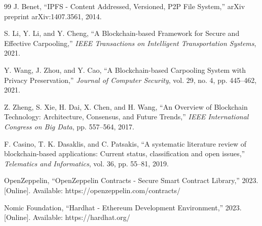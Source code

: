 \documentclass[12pt]{report}
\theoremstyle{plain}
\theoremstyle{definition}
\theoremstyle{remark}
\begin{document}
\begin{thebibliography}{99}
J. Benet, ``IPFS - Content Addressed, Versioned, P2P File System,'' arXiv preprint arXiv:1407.3561, 2014.

S. Li, Y. Li, and Y. Cheng, ``A Blockchain-based Framework for Secure and Effective Carpooling,'' \textit{IEEE Transactions on Intelligent Transportation Systems}, 2021.

Y. Wang, J. Zhou, and Y. Cao, ``A Blockchain-based Carpooling System with Privacy Preservation,'' \textit{Journal of Computer Security}, vol. 29, no. 4, pp. 445--462, 2021.

Z. Zheng, S. Xie, H. Dai, X. Chen, and H. Wang, ``An Overview of Blockchain Technology: Architecture, Consensus, and Future Trends,'' \textit{IEEE International Congress on Big Data}, pp. 557--564, 2017.

F. Casino, T. K. Dasaklis, and C. Patsakis, ``A systematic literature review of blockchain-based applications: Current status, classification and open issues,'' \textit{Telematics and Informatics}, vol. 36, pp. 55--81, 2019.

OpenZeppelin, ``OpenZeppelin Contracts - Secure Smart Contract Library,'' 2023. [Online]. Available: https://openzeppelin.com/contracts/

Nomic Foundation, ``Hardhat - Ethereum Development Environment,'' 2023. [Online]. Available: https://hardhat.org/

\end{thebibliography}
\end{document}
